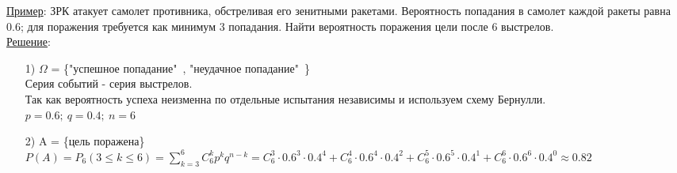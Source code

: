 \underline{Пример}: ЗРК атакует самолет противника, обстреливая его зенитными ракетами. Вероятность попадания в самолет каждой ракеты равна 0.6; для поражения требуется как минимум 3 попадания. Найти вероятность поражения цели после 6 выстрелов. \\
\underline{Решение}: \\
\begin{enumerate}
\item[1)] $\Omega$ = \{"успешное попадание"\ , "неудачное попадание"\ \} \\
Серия событий - серия выстрелов. \\
Так как вероятность успеха неизменна по отдельные испытания независимы и используем схему Бернулли. \\
$p = 0.6; \ q = 0.4; \ n = 6$ \\

\item[2)] A = \{цель поражена\} \\
$P(A) = P_6 (3 \leqslant k \leqslant 6) = \sum\limits_{k = 3}^{6} C^k_6 p^k q^{n - k} = C^3_6 \cdot 0.6^3 \cdot 0.4^4 + C^4_6 \cdot 0.6^4 \cdot 0.4^2 + C^5_6\cdot  0.6^5 \cdot 0.4^1 + C^6_6 \cdot 0.6^6 \cdot 0.4^0 \approx 0.82$
\end{enumerate}


